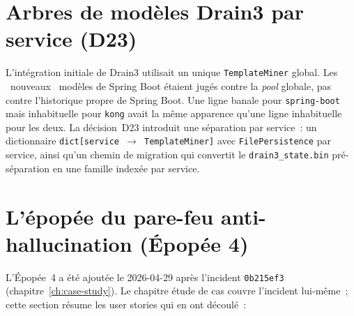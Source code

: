 \documentclass[11pt,a4paper,oneside]{report}
\begin{document}
\section{Arbres de modèles Drain3 par service (D23)}

L'intégration initiale de Drain3 utilisait un unique
\texttt{TemplateMiner} global. Les \og~nouveaux~\fg{} modèles de
Spring Boot étaient jugés contre la \emph{pool} globale, pas contre
l'historique propre de Spring Boot. Une ligne banale pour
\texttt{spring-boot} mais inhabituelle pour \texttt{kong} avait la
même apparence qu'une ligne inhabituelle pour les deux. La
décision~D23 introduit une séparation par service~: un dictionnaire
\texttt{dict[service $\to$ TemplateMiner]} avec
\texttt{FilePersistence} par service, ainsi qu'un chemin de
migration qui convertit le \texttt{drain3\_state.bin} pré-séparation
en une famille indexée par service.

\section{L'épopée du pare-feu anti-hallucination (Épopée 4)}

L'Épopée~4 a été ajoutée le 2026-04-29 après l'incident
\texttt{0b215ef3} (chapitre~\ref{ch:case-study}). Le chapitre étude
de cas couvre l'incident lui-même~; cette section résume les user
stories qui en ont découlé~:
\end{document}

